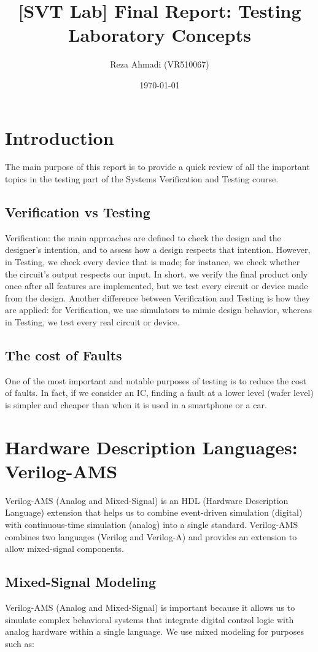 \documentclass[12pt, a4paper]{article}
\title{[SVT Lab] Final Report: Testing Laboratory Concepts}
\author{Reza Ahmadi (VR510067)}
\date{\today}
\begin{document}
\maketitle
\newpage

\tableofcontents
\newpage

\section{Introduction}
The main purpose of this report is to provide a quick review of all the important topics in the testing part of the Systems Verification and Testing course.
\subsection{Verification vs Testing}
Verification: the main approaches are defined to check the design and the designer's intention, and to assess how a design respects that intention. However, in Testing, we check every device that is made; for instance, we check whether the circuit's output respects our input.
In short, we verify the final product only once after all features are implemented, but we test every circuit or device made from the design.
Another difference between Verification and Testing is how they are applied: for Verification, we use simulators to mimic design behavior, whereas in Testing, we test every real circuit or device.
\subsection{The cost of Faults}
One of the most important and notable purposes of testing is to reduce the cost of faults. In fact, if we consider an IC, finding a fault at a lower level (wafer level) is simpler and cheaper than when it is used in a smartphone or a car.

\section{Hardware Description Languages: Verilog-AMS}
Verilog-AMS (Analog and Mixed-Signal) is an HDL (Hardware Description Language) extension that helps us to combine event-driven simulation (digital) with continuous-time simulation (analog) into a single standard.
Verilog-AMS combines two languages (Verilog and Verilog-A) and provides an extension to allow mixed-signal components.
\subsection{Mixed-Signal Modeling}
Verilog-AMS (Analog and Mixed-Signal) is important because it allows us to simulate complex behavioral systems that integrate digital control logic with analog hardware within a single language. We use mixed modeling for purposes such as:
\end{document}
